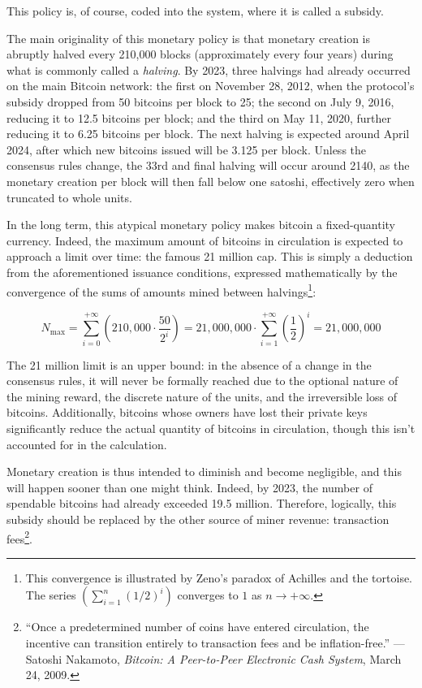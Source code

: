 \documentclass[
  a5paper,
  smalldemyvopaper,10pt,twoside,onecolumn,openright,extrafontsizes,hidelinks]{memoir}
\newlength\drop
\begin{document}
This policy is, of course, coded into the system, where it is called a
subsidy.

The main originality of this monetary policy is that monetary creation
is abruptly halved every 210,000 blocks (approximately every four years)
during what is commonly called a \emph{halving}. By 2023, three halvings
had already occurred on the main Bitcoin network: the first on November
28, 2012, when the protocol's subsidy dropped from 50 bitcoins per block
to 25; the second on July 9, 2016, reducing it to 12.5 bitcoins per
block; and the third on May 11, 2020, further reducing it to 6.25
bitcoins per block. The next halving is expected around April 2024,
after which new bitcoins issued will be 3.125 per block. Unless the
consensus rules change, the 33rd and final halving will occur around
2140, as the monetary creation per block will then fall below one
satoshi, effectively zero when truncated to whole units.

In the long term, this atypical monetary policy makes bitcoin a
fixed-quantity currency. Indeed, the maximum amount of bitcoins in
circulation is expected to approach a limit over time: the famous 21
million cap. This is simply a deduction from the aforementioned issuance
conditions, expressed mathematically by the convergence of the sums of
amounts mined between halvings\footnote{This convergence is illustrated
  by Zeno's paradox of Achilles and the tortoise. The series
  \(\left( \sum_{i=1}^{n} (1/2)^i \right)\) converges to \(1\) as
  \(n\to+\infty\).}:

\[N_{\mathrm{max}} = \sum_{i=0}^{+\infty} \left( {210,000 \cdot \frac{50}{2^i}} \right) = 21,000,000 \cdot \sum_{i=1}^{+\infty} \left(\frac{1}{2}\right)^i = 21,000,000\]

The 21 million limit is an upper bound: in the absence of a change in
the consensus rules, it will never be formally reached due to the
optional nature of the mining reward, the discrete nature of the units,
and the irreversible loss of bitcoins. Additionally, bitcoins whose
owners have lost their private keys significantly reduce the actual
quantity of bitcoins in circulation, though this isn't accounted for in
the calculation.

Monetary creation is thus intended to diminish and become negligible,
and this will happen sooner than one might think. Indeed, by 2023, the
number of spendable bitcoins had already exceeded 19.5 million.
Therefore, logically, this subsidy should be replaced by the other
source of miner revenue: transaction fees\footnote{``Once a
  predetermined number of coins have entered circulation, the incentive
  can transition entirely to transaction fees and be inflation-free.''
  --- Satoshi Nakamoto, \emph{Bitcoin: A Peer-to-Peer Electronic Cash
  System}, March 24, 2009.}.
\end{document}
